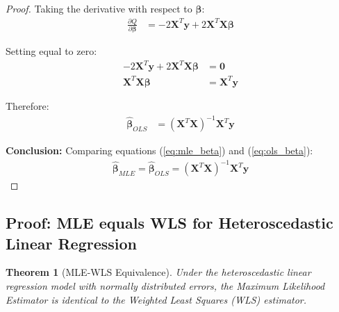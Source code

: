 \documentclass{article}
\newtheorem{theorem}{Theorem}
\begin{document}
\begin{proof}
Taking the derivative with respect to $\boldsymbol{\beta}$:
\begin{align}
\frac{\partial Q}{\partial \boldsymbol{\beta}} &= -2\mathbf{X}^T\mathbf{y} + 2\mathbf{X}^T\mathbf{X}\boldsymbol{\beta}
\end{align}

Setting equal to zero:
\begin{align}
-2\mathbf{X}^T\mathbf{y} + 2\mathbf{X}^T\mathbf{X}\boldsymbol{\beta} &= \mathbf{0} \nonumber\\
\mathbf{X}^T\mathbf{X}\boldsymbol{\beta} &= \mathbf{X}^T\mathbf{y}
\end{align}

Therefore:
\begin{align}
\hat{\boldsymbol{\beta}}_{OLS} &= (\mathbf{X}^T\mathbf{X})^{-1}\mathbf{X}^T\mathbf{y} \label{eq:ols_beta}
\end{align}

\textbf{Conclusion:} Comparing equations (\ref{eq:mle_beta}) and (\ref{eq:ols_beta}):
\begin{align}
\hat{\boldsymbol{\beta}}_{MLE} = \hat{\boldsymbol{\beta}}_{OLS} = (\mathbf{X}^T\mathbf{X})^{-1}\mathbf{X}^T\mathbf{y}
\end{align}

\end{proof}

\subsection{Proof: MLE equals WLS for Heteroscedastic Linear Regression}

\begin{theorem}[MLE-WLS Equivalence]
Under the heteroscedastic linear regression model with normally distributed errors, the Maximum Likelihood Estimator is identical to the Weighted Least Squares (WLS) estimator.
\end{theorem}
\end{document}

